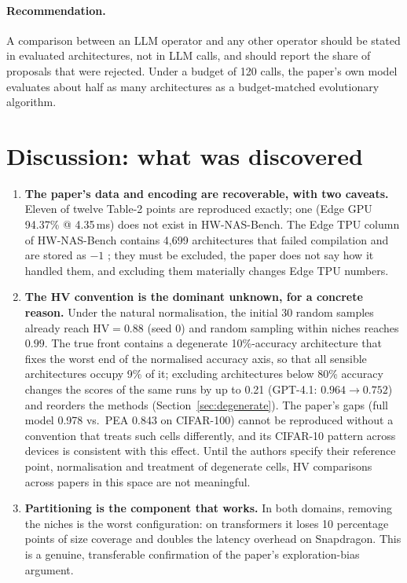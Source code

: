 \documentclass[11pt,a4paper]{article}
\newcommand{\HV}{\mathrm{HV}}
\begin{document}
\paragraph{Recommendation.} A comparison between an LLM operator and any other operator should be stated in evaluated architectures, not in LLM calls, and should report the share of proposals that were rejected. Under a budget of 120 calls, the paper's own model evaluates about half as many architectures as a budget-matched evolutionary algorithm.

\section{Discussion: what was discovered}\label{sec:discussion}
\begin{enumerate}
  \item \textbf{The paper's data and encoding are recoverable, with two caveats.} Eleven of twelve Table-2 points are reproduced exactly; one (Edge GPU 94.37\% @ 4.35\,ms) does not exist in HW-NAS-Bench. The Edge TPU column of HW-NAS-Bench contains 4{,}699 architectures that failed compilation and are stored as $-1$ \cite{hwnasissue}; they must be excluded, the paper does not say how it handled them, and excluding them materially changes Edge TPU numbers.
  \item \textbf{The HV convention is the dominant unknown, for a concrete reason.} Under the natural normalisation, the initial 30 random samples already reach $\HV=0.88$ (seed 0) and random sampling within niches reaches $0.99$. The true front contains a degenerate 10\%-accuracy architecture that fixes the worst end of the normalised accuracy axis, so that all sensible architectures occupy 9\% of it; excluding architectures below 80\% accuracy changes the scores of the same runs by up to 0.21 (GPT-4.1: $0.964\to0.752$) and reorders the methods (Section~\ref{sec:degenerate}). The paper's gaps (full model 0.978 vs.\ PEA 0.843 on CIFAR-100) cannot be reproduced without a convention that treats such cells differently, and its CIFAR-10 pattern across devices is consistent with this effect. Until the authors specify their reference point, normalisation and treatment of degenerate cells, HV comparisons across papers in this space are not meaningful.
  \item \textbf{Partitioning is the component that works.} In both domains, removing the niches is the worst configuration: on transformers it loses 10 percentage points of size coverage and doubles the latency overhead on Snapdragon. This is a genuine, transferable confirmation of the paper's exploration-bias argument.

\end{enumerate}
\end{document}
